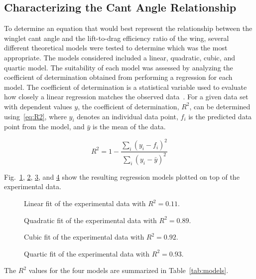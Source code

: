 \documentclass[journal,letterpaper]{IEEEtran}
\begin{document}
\subsection{Characterizing the Cant Angle Relationship}

To determine an equation that would best represent the relationship between the winglet cant angle and the lift-to-drag efficiency ratio of the wing, several different theoretical models were tested to determine which was the most appropriate.
The models considered included a linear, quadratic, cubic, and quartic model.
The suitability of each model was assessed by analyzing the coefficient of determination obtained from performing a regression for each model.
The coefficient of determination is a statistical variable used to evaluate how closely a linear regression matches the observed data~\cite{rSquare}.
For a given data set with dependent values $y$, the coefficient of determination, $R^2$, can be determined using~\eqref{eq:R2}, where $y_i$ denotes an individual data point, $f_i$ is the predicted data point from the model, and $\bar{y}$ is the mean of the data.

\begin{equation} \label{eq:R2}
    R^2 = 1 - \frac{\sum_i \left(y_i - f_i\right)^2}{\sum_i \left(y_i - \bar{y}\right)^2}
\end{equation}

Fig.~\ref{fig:n1}, \ref{fig:n2}, \ref{fig:n3}, and \ref{fig:n4} show the resulting regression models plotted on top of the experimental data.

\begin{figure}[H]
    \centering
    
    \caption{Linear fit of the experimental data with $R^2 = 0.11$.}
    \label{fig:n1}
\end{figure}

\begin{figure}[H]
    \centering
    
    \caption{Quadratic fit of the experimental data with $R^2 = 0.89$.}
    \label{fig:n2}
\end{figure}

\begin{figure}[H]
    \centering
    
    \caption{Cubic fit of the experimental data with $R^2 = 0.92$.}
    \label{fig:n3}
\end{figure}

\begin{figure}[H]
    \centering
    
    \caption{Quartic fit of the experimental data with $R^2 = 0.93$.}
    \label{fig:n4}
\end{figure}
\noindent
The $R^2$ values for the four models are summarized in Table~\ref{tab:models}.
\end{document}
